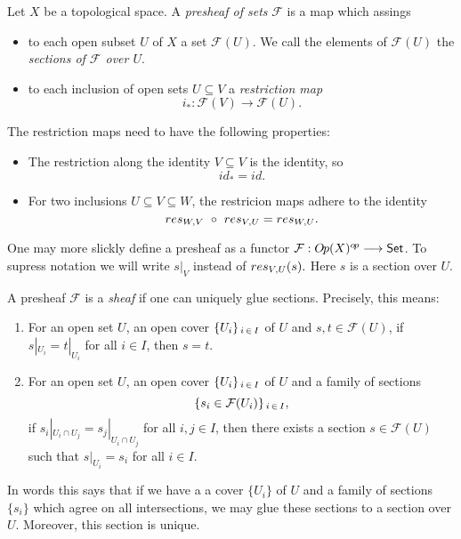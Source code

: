 \begin{definition}[Presheaves] 
  Let $X$ be a topological space. A \textit{presheaf of sets} $\mathcal{F}$  is a map which assings
  \begin{itemize}
    \item to each open subset $U$ of $X$ a set $\mathcal{F}(U)$. We call the elements of $\mathcal{F}(U)$ the \textit{sections of $\mathcal{F}$ over $U$}.
    \item to each inclusion of open sets $U \subseteq V$ a \textit{restriction map}
    \[i_*: \mathcal{F}(V) \longrightarrow\mathcal{F}(U).\]
  \end{itemize}
    The restriction maps need to have the following properties: 
    \begin{itemize}
      \item The restriction along the identity $V \subseteq V$ is the identity, so 
            \[id_* = id.\]
      \item For two inclusions $U \subseteq V \subseteq W$, the restricion maps adhere to the identity 
            \[res_{W\kern-0.1em , V}\ \circ\ res_{V\kern-0.1em , U} = res_{W\kern-0.1em , U}.\]
    \end{itemize}
  One may more slickly define a presheaf as a functor $\mathcal{F}: O\kern-0.10em p(X)^{o\kern-0.10em p}\longrightarrow \mathsf{Set}$. To supress notation we will write $s|_V$ instead of $res_{V\kern-0.1em , U}(s).$ Here $s$ is a section over $U$.\\
\end{definition}
\begin{definition}[Sheaves]
  A presheaf $\mathcal{F}$ is a \textit{sheaf} if one can uniquely glue sections. Precisely, this means:
  \begin{enumerate}
    \item For an open set $U$, an open cover $\{U_i\}_{\, i\, \in \, I}$ of $U$ and $s, t \in \mathcal{F}(U)$, if $s|_{U_i} = t|_{U_i}$ for all $i \in I$, then $s = t$.
    \item For an open set $U$, an open cover $\{U_i\}_{\, i\, \in \, I}$ of $U$ and a family of sections
    \[\{s_i \in \mathcal{F}(U_i)\}_{\, i\, \in \, I},\]
     if $s_i|_{U_i \cap U_j} = s_j|_{U_i \cap U_j}$ for all $i,j \in I$, then there exists a section $s \in \mathcal{F}(U)$ such that $s|_{U_i} = s_i$ for all $i \in I$.
  \end{enumerate}
  In words this says that if we have a a cover $\{U_i\}$ of $U$ and a family of sections $\{s_i\}$ which agree on all intersections, we may glue these sections to a section over $U$. Moreover, this section is unique.
\end{definition}

